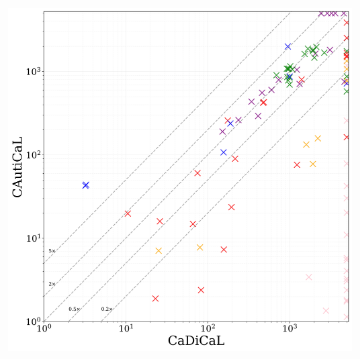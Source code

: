 \begin{figure}[!t]
    \centering
    \begin{subfigure}[t]{0.45\textwidth}
            \centering
            \includegraphics[width=\textwidth]{figs/cadical_vs_cautical_interesting.jpg}
            \label{fig:cautical-vs-cadical}
    \end{subfigure}
    \begin{subfigure}[t]{0.45\textwidth}
        \centering

\end{subfigure}
\end{figure}
